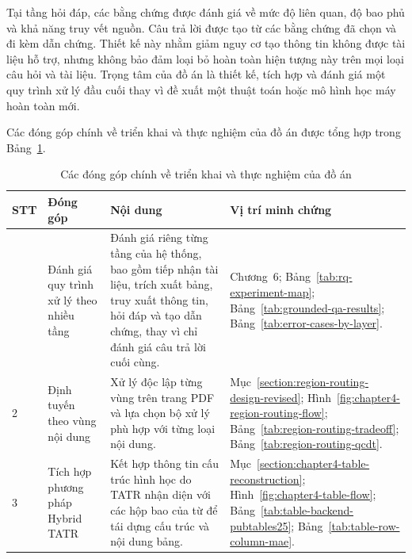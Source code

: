\documentclass[../DoAn.tex]{subfiles}
\begin{document}
Tại tầng hỏi đáp, các bằng chứng được đánh giá về mức độ liên quan, độ bao phủ và khả năng truy vết nguồn. Câu trả lời được tạo từ các bằng chứng đã chọn và đi kèm dẫn chứng. Thiết kế này nhằm giảm nguy cơ tạo thông tin không được tài liệu hỗ trợ, nhưng không bảo đảm loại bỏ hoàn toàn hiện tượng này trên mọi loại câu hỏi và tài liệu.
Trọng tâm của đồ án là thiết kế, tích hợp và đánh giá một quy trình xử lý đầu cuối thay vì đề xuất một thuật toán hoặc mô hình học máy hoàn toàn mới.





Các đóng góp chính về triển khai và thực nghiệm của đồ án được tổng hợp trong
Bảng~\ref{tab:main-contributions}.


\begin{table}[H]
\centering
\footnotesize
\setlength{\tabcolsep}{5pt}
\renewcommand{\arraystretch}{1.25}


\caption{Các đóng góp chính về triển khai và thực nghiệm của đồ án}
\label{tab:main-contributions}

\begin{tabularx}{\textwidth}{
    |>{\centering\arraybackslash}p{}
    |>{\raggedright\arraybackslash}p{}
    |>{\raggedright\arraybackslash}X
    |>{\raggedright\arraybackslash}p{}|
}
    \hline

    \textbf{STT}
    & \textbf{Đóng góp}
    & \textbf{Nội dung}
    & \textbf{Vị trí minh chứng} \\
    \hline

    1
    & Đánh giá quy trình xử lý theo nhiều tầng
    & Đánh giá riêng từng tầng của hệ thống, bao gồm tiếp nhận tài liệu,
    trích xuất bảng, truy xuất thông tin, hỏi đáp và tạo dẫn chứng, thay vì
    chỉ đánh giá câu trả lời cuối cùng.
    & Chương~6; Bảng~\ref{tab:rq-experiment-map}; Bảng~\ref{tab:grounded-qa-results}; Bảng~\ref{tab:error-cases-by-layer}. \\
    \hline

    2
    & Định tuyến theo vùng nội dung
    & Xử lý độc lập từng vùng trên trang PDF và lựa chọn bộ xử lý phù hợp
    với từng loại nội dung.
    & Mục~\ref{section:region-routing-design-revised}; Hình~\ref{fig:chapter4-region-routing-flow}; Bảng~\ref{tab:region-routing-tradeoff}; Bảng~\ref{tab:region-routing-qcdt}. \\
    \hline

    3
    & Tích hợp phương pháp Hybrid TATR
    & Kết hợp thông tin cấu trúc hình học do TATR nhận diện với các hộp bao
    của từ để tái dựng cấu trúc và nội dung bảng.
    & Mục~\ref{section:chapter4-table-reconstruction}; Hình~\ref{fig:chapter4-table-flow}; Bảng~\ref{tab:table-backend-pubtables25}; Bảng~\ref{tab:table-row-column-mae}. \\
    \hline


\end{tabularx}
\end{table}
\end{document}
